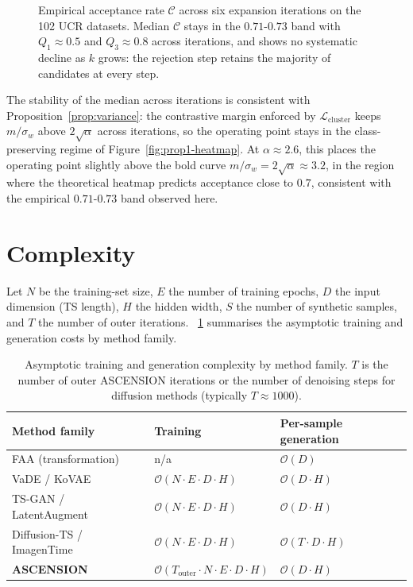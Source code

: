 \begin{figure}[!htb]
\centering
\resizebox{0.55\textwidth}{!}{}
\caption{Empirical acceptance rate $\mathcal{C}$
across six expansion iterations on the 102 UCR datasets.
Median $\mathcal{C}$ stays in the $0.71$-$0.73$ band with
$Q_1 \approx 0.5$ and $Q_3 \approx 0.8$ across iterations, and shows
no systematic decline as $k$ grows: the rejection step retains the
majority of candidates at every step.}
\label{fig:risk-boxplot}
\end{figure}

The stability of the median across iterations is consistent with
Proposition~\ref{prop:variance}: the contrastive margin enforced
by $\mathcal{L}_{\text{cluster}}$ keeps $m/\sigma_w$ above
$2\sqrt{\alpha}$ across iterations, so the operating point stays in
the class-preserving regime of Figure~\ref{fig:prop1-heatmap}.
At $\alpha \approx 2.6$, this places the operating point
slightly above the bold curve $m/\sigma_w = 2\sqrt{\alpha} \approx
3.2$, in the region where the theoretical heatmap predicts
acceptance close to $0.7$, consistent with the empirical
$0.71$-$0.73$ band observed here.



\section{Complexity}
\label{sec:complexity:big_o}

Let $N$ be the training-set size, $E$ the number of training
epochs, $D$ the input dimension (TS length), $H$ the
hidden width, $S$ the number of synthetic samples, and $T$ the
number of outer iterations. \tablename~\ref{tab:complexity} summarises
the asymptotic training and generation costs by method family.

\begin{table}[!htb]
\centering
\small
\caption{Asymptotic training and generation complexity by method
family. $T$ is the number of outer ASCENSION iterations or the
number of denoising steps for diffusion methods (typically
$T \approx 1000$).}
\label{tab:complexity}
\begin{tabular}{lll}
\toprule
\textbf{Method family} & \textbf{Training} & \textbf{Per-sample generation} \\
\midrule
FAA (transformation)     & n/a                                        & $\mathcal{O}(D)$ \\
VaDE / KoVAE             & $\mathcal{O}(N \cdot E \cdot D \cdot H)$   & $\mathcal{O}(D \cdot H)$ \\
TS-GAN / LatentAugment   & $\mathcal{O}(N \cdot E \cdot D \cdot H)$   & $\mathcal{O}(D \cdot H)$ \\
Diffusion-TS / ImagenTime& $\mathcal{O}(N \cdot E \cdot D \cdot H)$   & $\mathcal{O}(T \cdot D \cdot H)$ \\
\textbf{ASCENSION}       & $\mathcal{O}(T_{\text{outer}} \cdot N \cdot E \cdot D \cdot H)$ & $\mathcal{O}(D \cdot H)$ \\
\bottomrule
\end{tabular}
\end{table}


